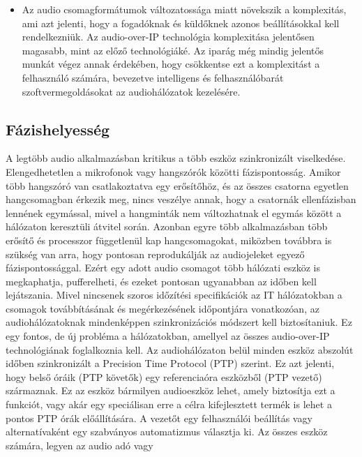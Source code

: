 \begin{itemize}
	\item Az audio csomagformátumok változatossága miatt növekszik a komplexitás,
	      ami azt jelenti, hogy a fogadóknak és küldőknek azonos beállításokkal kell
	      rendelkezniük. Az audio-over-IP technológia komplexitása jelentősen magasabb,
	      mint az előző technológiáké. Az iparág még mindig jelentős munkát végez annak
	      érdekében, hogy csökkentse ezt a komplexitást a felhasználó számára, bevezetve
	      intelligens és felhasználóbarát szoftvermegoldásokat az audiohálózatok
	      kezelésére.
\end{itemize}
\subsection{Fázishelyesség}
A legtöbb audio alkalmazásban kritikus a több eszköz szinkronizált viselkedése.
Elengedhetetlen a mikrofonok vagy hangszórók közötti fázispontosság.
Amikor több hangszóró van csatlakoztatva egy erősítőhöz, és az összes csatorna
egyetlen hangcsomagban érkezik meg, nincs veszélye annak, hogy a csatornák
ellenfázisban lennének egymással, mivel a hangminták nem változhatnak el egymás
között a hálózaton keresztüli átvitel során. 
Azonban egyre több alkalmazásban több erősítő és processzor függetlenül kap hangcsomagokat,
miközben továbbra is szükség van arra, hogy pontosan reprodukálják az audiojeleket egyező fázispontossággal.
Ezért egy adott audio csomagot több hálózati eszköz is megkaphatja, pufferelheti, és ezeket
pontosan ugyanabban az időben kell lejátszania. 
Mivel nincsenek szoros időzítési specifikációk az IT hálózatokban a csomagok továbbításának és
megérkezésének időpontjára vonatkozóan, az audiohálózatoknak mindenképpen szinkronizációs
módszert kell biztosítaniuk. Ez egy fontos, de új probléma a hálózatokban, amellyel az összes
audio-over-IP technológiának foglalkoznia kell.
Az audiohálózaton belül minden eszköz abszolút időben szinkronizált
a Precision Time Protocol (PTP) szerint. Ez azt jelenti, hogy belső óráik (PTP
követők) egy referenciaóra eszközből (PTP vezető) származnak. Ez az eszköz
bármilyen audioeszköz lehet, amely biztosítja ezt a funkciót, vagy akár egy
speciálisan erre a célra kifejlesztett termék is lehet a pontos PTP órák előállítására.
A vezetőt egy felhasználói beállítás vagy alternatívaként egy szabványos
automatizmus választja ki. Az összes eszköz számára, legyen az audio adó vagy
